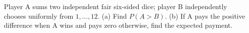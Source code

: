 Player A sums two independent fair six-sided dice; player B independently chooses uniformly from $1,\ldots,12$. (a) Find $P(A>B)$. (b) If A pays the positive difference when A wins and pays zero otherwise, find the expected payment.
